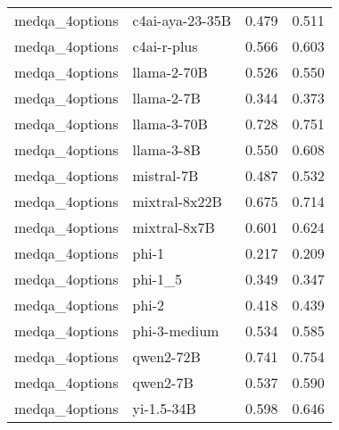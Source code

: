 \begin{tabular}{llrr}
medqa_4options & c4ai-aya-23-35B & 0.479 & 0.511 \\
medqa_4options & c4ai-r-plus & 0.566 & 0.603 \\
medqa_4options & llama-2-70B & 0.526 & 0.550 \\
medqa_4options & llama-2-7B & 0.344 & 0.373 \\
medqa_4options & llama-3-70B & 0.728 & 0.751 \\
medqa_4options & llama-3-8B & 0.550 & 0.608 \\
medqa_4options & mistral-7B & 0.487 & 0.532 \\
medqa_4options & mixtral-8x22B & 0.675 & 0.714 \\
medqa_4options & mixtral-8x7B & 0.601 & 0.624 \\
medqa_4options & phi-1 & 0.217 & 0.209 \\
medqa_4options & phi-1_5 & 0.349 & 0.347 \\
medqa_4options & phi-2 & 0.418 & 0.439 \\
medqa_4options & phi-3-medium & 0.534 & 0.585 \\
medqa_4options & qwen2-72B & 0.741 & 0.754 \\
medqa_4options & qwen2-7B & 0.537 & 0.590 \\
medqa_4options & yi-1.5-34B & 0.598 & 0.646 \\
\bottomrule
\end{tabular}
